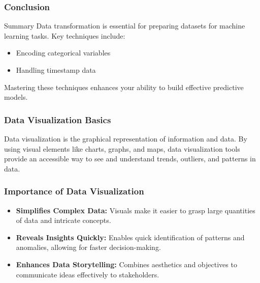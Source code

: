 \documentclass[aspectratio=169]{beamer}
\begin{document}
\begin{frame}
    \frametitle{Conclusion}
    \begin{block}{Summary}
        Data transformation is essential for preparing datasets for machine learning tasks. 
        Key techniques include:
        \begin{itemize}
            \item Encoding categorical variables
            \item Handling timestamp data
        \end{itemize}
        Mastering these techniques enhances your ability to build effective predictive models.
    \end{block}
\end{frame}

\begin{frame}[fragile]
    \frametitle{Data Visualization Basics}
    Data visualization is the graphical representation of information and data. By using visual elements like charts, graphs, and maps, data visualization tools provide an accessible way to see and understand trends, outliers, and patterns in data.
\end{frame}

\begin{frame}[fragile]
    \frametitle{Importance of Data Visualization}
    \begin{itemize}
        \item \textbf{Simplifies Complex Data:} Visuals make it easier to grasp large quantities of data and intricate concepts.
        \item \textbf{Reveals Insights Quickly:} Enables quick identification of patterns and anomalies, allowing for faster decision-making.
        \item \textbf{Enhances Data Storytelling:} Combines aesthetics and objectives to communicate ideas effectively to stakeholders.
    \end{itemize}
\end{frame}
\end{document}
